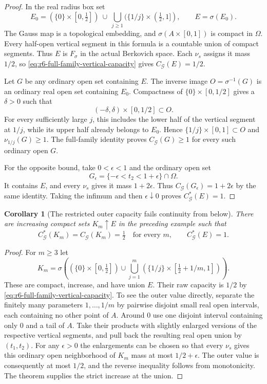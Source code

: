 \documentclass[11pt,a4paper]{article}
\numberwithin{equation}{section}
\newtheorem{corollary}[theorem]{Corollary}
\theoremstyle{definition}
\theoremstyle{remark}
\begin{document}
\begin{proof}
In the real radius box set
\[
 E_0=(\{0\}\times[0,\tfrac12])
            \ \cup\ \bigcup_{j\ge1}
                    (\{1/j\}\times(\tfrac12,1]),
                 \qquad E=\sigma(E_0).
\]
The Gauss map is a topological embedding, and
$\sigma(A\times[0,1])$ is compact in $\Omega$. Every half-open
vertical segment in this formula is a countable union of compact
segments. Thus $E$ is $F_\sigma$ in the actual Berkovich space.
Each $\nu_s$ assigns it mass $1/2$, so
\eqref{eq:r6-full-family-vertical-capacity} gives
$C_{\mathscr G}(E)=1/2$.

Let $G$ be any ordinary open set containing $E$. The inverse
image $O=\sigma^{-1}(G)$ is an ordinary real open set containing
$E_0$. Compactness of $\{0\}\times[0,1/2]$ gives a $\delta>0$
such that
\[
                (-\delta,\delta)\times[0,1/2]\subset O.
\]
For every sufficiently large $j$, this includes the lower half of
the vertical segment at $1/j$, while its upper half already belongs
to $E_0$. Hence $\{1/j\}\times[0,1]\subset O$ and
$\nu_{1/j}(G)\ge1$. The full-family identity proves
$C_{\mathscr G}(G)\ge1$ for every such ordinary open $G$.

For the opposite bound, take $0<\epsilon<1$ and the ordinary open
set
\[
                 G_\epsilon=\{-\epsilon<t_2<1+\epsilon\}
                                         \cap\Omega.
\]
It contains $E$, and every $\nu_s$ gives it mass $1+2\epsilon$.
Thus $C_{\mathscr G}(G_\epsilon)=1+2\epsilon$ by the same
identity. Taking the infimum and then $\epsilon\downarrow0$
proves $C_{\mathscr G}^{*}(E)=1$.
\end{proof}

\begin{corollary}[The restricted outer capacity fails continuity from below]
\label{cor:r6-compact-dominator-outer-from-below}
There are increasing compact sets $K_m\uparrow E$ in the preceding
example such that
\[
 C_{\mathscr G}^{*}(K_m)=C_{\mathscr G}(K_m)=\tfrac12
       \quad\text{for every }m,\qquad
 C_{\mathscr G}^{*}(E)=1.
\]
\end{corollary}

\begin{proof}
For $m\ge3$ let
\[
 K_m=\sigma\left((\{0\}\times[0,\tfrac12])
       \cup\bigcup_{j=1}^{m}
             (\{1/j\}\times[\tfrac12+1/m,1])\right).
\]
These are compact, increase, and have union $E$. Their raw
capacity is $1/2$ by \eqref{eq:r6-full-family-vertical-capacity}.
To see the outer value directly, separate the finitely many
parameters $1,\ldots,1/m$ by pairwise disjoint small real open
intervals, each containing no other point of $A$. Around $0$ use
one disjoint interval containing only $0$ and a tail of $A$.
Take their products with slightly enlarged versions of the respective
vertical segments, and pull back the resulting real open union by
$(t_1,t_2)$. For any $\epsilon>0$ the enlargements can be chosen
so that every $\nu_s$ gives this ordinary open neighborhood of
$K_m$ mass at most $1/2+\epsilon$. The outer value is consequently
at most $1/2$, and the reverse inequality follows from monotonicity.
The theorem supplies the strict increase at the union.
\end{proof}
\end{document}

